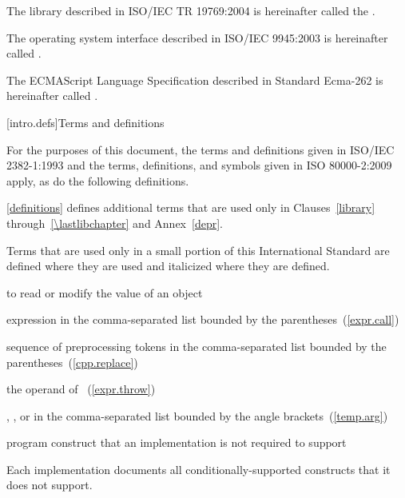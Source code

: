\pnum
The library described in ISO/IEC TR 19769:2004 is hereinafter called the
.

\pnum
The operating system interface described in ISO/IEC 9945:2003 is
hereinafter called .

\pnum
The ECMAScript Language Specification described in Standard Ecma-262 is
hereinafter called .

[intro.defs]{Terms and definitions}

\pnum
{}%
For the purposes of this document,
the terms and definitions
given in ISO/IEC 2382-1:1993 and
the terms, definitions, and symbols
given in ISO 80000-2:2009 apply,
as do the following definitions.

\pnum
\ref{definitions}
defines additional terms that are used only in Clauses~\ref{library}
through~\ref{\lastlibchapter} and Annex~\ref{depr}.

\pnum
Terms that are used only in a small portion of this International
Standard are defined where they are used and italicized where they are
defined.

%
 to read or modify the value of an object

%
 expression in the
comma-separated list bounded by the parentheses~(\ref{expr.call})

%
%
 sequence of preprocessing tokens in the
comma-separated list bounded by the parentheses~(\ref{cpp.replace})

%
%
 the operand of ~(\ref{expr.throw})

%
%
,
, or
 in the comma-separated
list bounded by the angle brackets~(\ref{temp.arg})

%
program construct that an implementation is not required to support\\
\begin{note} Each implementation documents all conditionally-supported
constructs that it does not support.\end{note}

